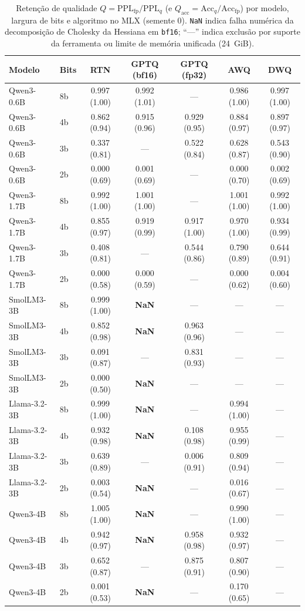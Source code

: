 \begin{table}[htbp]
\centering
\caption{Retenção de qualidade $Q = \text{PPL}_{\text{fp}}/\text{PPL}_q$ (e $Q_{\text{acc}} = \text{Acc}_q/\text{Acc}_{\text{fp}}$) por modelo, largura de bits e algoritmo no MLX (semente 0). \texttt{NaN} indica falha numérica da decomposição de Cholesky da Hessiana em \texttt{bf16}; ``---'' indica exclusão por suporte da ferramenta ou limite de memória unificada (24~GiB).}
\label{tab:qualidade_mlx}
\footnotesize
\begin{tabular}{llccccc}
\toprule
Modelo & Bits & RTN & GPTQ (bf16) & GPTQ (fp32) & AWQ & DWQ \\
\midrule
Qwen3-0.6B & 8b & 0.997 (1.00) & 0.992 (1.01) & --- & 0.986 (1.00) & 0.997 (1.00) \\
Qwen3-0.6B & 4b & 0.862 (0.94) & 0.915 (0.96) & 0.929 (0.95) & 0.884 (0.97) & 0.897 (0.97) \\
Qwen3-0.6B & 3b & 0.337 (0.81) & --- & 0.522 (0.84) & 0.628 (0.87) & 0.543 (0.90) \\
Qwen3-0.6B & 2b & 0.000 (0.69) & 0.001 (0.69) & --- & 0.000 (0.70) & 0.002 (0.69) \\
\midrule
Qwen3-1.7B & 8b & 0.992 (1.00) & 1.001 (1.00) & --- & 1.001 (1.00) & 0.992 (1.00) \\
Qwen3-1.7B & 4b & 0.855 (0.97) & 0.919 (0.99) & 0.917 (1.00) & 0.970 (1.00) & 0.934 (0.99) \\
Qwen3-1.7B & 3b & 0.408 (0.81) & --- & 0.544 (0.86) & 0.790 (0.89) & 0.644 (0.91) \\
Qwen3-1.7B & 2b & 0.000 (0.58) & 0.000 (0.59) & --- & 0.000 (0.62) & 0.004 (0.60) \\
\midrule
SmolLM3-3B & 8b & 0.999 (1.00) & \textbf{NaN} & --- & --- & --- \\
SmolLM3-3B & 4b & 0.852 (0.98) & \textbf{NaN} & 0.963 (0.96) & --- & --- \\
SmolLM3-3B & 3b & 0.091 (0.87) & --- & 0.831 (0.93) & --- & --- \\
SmolLM3-3B & 2b & 0.000 (0.50) & \textbf{NaN} & --- & --- & --- \\
\midrule
Llama-3.2-3B & 8b & 0.999 (1.00) & \textbf{NaN} & --- & 0.994 (1.00) & --- \\
Llama-3.2-3B & 4b & 0.932 (0.98) & \textbf{NaN} & 0.108 (0.98) & 0.955 (0.99) & --- \\
Llama-3.2-3B & 3b & 0.639 (0.89) & --- & 0.006 (0.91) & 0.809 (0.94) & --- \\
Llama-3.2-3B & 2b & 0.003 (0.54) & \textbf{NaN} & --- & 0.016 (0.67) & --- \\
\midrule
Qwen3-4B & 8b & 1.005 (1.00) & \textbf{NaN} & --- & 0.990 (1.00) & --- \\
Qwen3-4B & 4b & 0.942 (0.97) & \textbf{NaN} & 0.958 (0.98) & 0.932 (0.97) & --- \\
Qwen3-4B & 3b & 0.652 (0.87) & --- & 0.875 (0.91) & 0.807 (0.90) & --- \\
Qwen3-4B & 2b & 0.001 (0.53) & \textbf{NaN} & --- & 0.170 (0.65) & --- \\
\bottomrule
\end{tabular}
\end{table}
